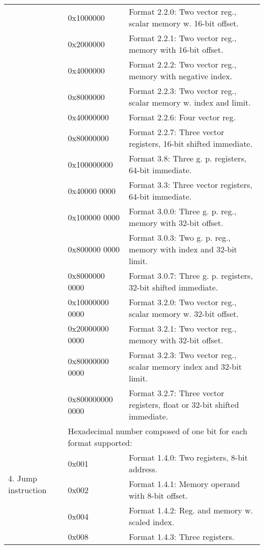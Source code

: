 \documentclass[forwardcom.tex]{subfiles}
\begin{document}
\begin{longtable} {|p{18mm}|p{20mm} p{80mm}|}
  &  0x1000000 & Format 2.2.0: Two vector reg., scalar memory w. 16-bit offset. \\
  &  0x2000000 & Format 2.2.1: Two vector reg., memory with 16-bit offset. \\
  &  0x4000000 & Format 2.2.2: Two vector reg., memory with negative index. \\
  &  0x8000000 & Format 2.2.3: Two vector reg., scalar memory w. index and limit. \\
  & 0x40000000 & Format 2.2.6: Four vector reg. \\
  & 0x80000000 & Format 2.2.7: Three vector registers, 16-bit shifted immediate.\\
  
  & 0x100000000 & Format 3.8:   Three g. p. registers, 64-bit immediate. \\
  & 0x40000 0000 & Format 3.3:   Three vector registers, 64-bit immediate. \\
 
  &  0x100000 0000 & Format 3.0.0: Three g. p. reg., memory with 32-bit offset. \\
  &  0x800000 0000 & Format 3.0.3: Two g. p. reg., memory with index and 32-bit limit.\\  
  &  0x8000000 0000 & Format 3.0.7: Three g. p. registers, 32-bit shifted immediate. \\  

  &  0x10000000 0000 & Format 3.2.0: Two vector reg., scalar memory w. 32-bit offset. \\
  &  0x20000000 0000 & Format 3.2.1: Two vector reg., memory with 32-bit offset. \\
  &  0x80000000 0000 & Format 3.2.3: Two vector reg., scalar memory index and 32-bit limit. \\
  & 0x800000000 0000 & Format 3.2.7: Three vector registers, float or 32-bit shifted immediate.\\

\hline

\multirow{12}{*}{\parbox[t]{18mm}{4. Jump instruction}} 
  &  \multicolumn{2}{|l|}{
     Hexadecimal number composed of one bit for each format supported:} \\
  &  0x001 & Format 1.4.0: Two registers, 8-bit address. \\
  &  0x002 & Format 1.4.1: Memory operand with 8-bit offset. \\
  &  0x004 & Format 1.4.2: Reg. and memory w. scaled index. \\
  &  0x008 & Format 1.4.3: Three registers. \\
  

\end{longtable}
\end{document}
